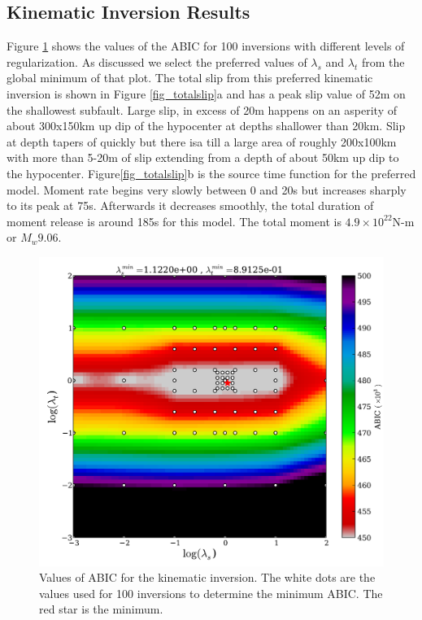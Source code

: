 \subsection{Kinematic Inversion Results}
Figure \ref{fig_ABIC} shows the values of the ABIC for 100 inversions with different levels of regularization. As discussed we select the preferred values of $\lambda_s$ and $\lambda_t$ from the global minimum of that plot. The total slip from this preferred kinematic inversion is shown in Figure \ref{fig_totalslip}a and has a peak slip value of 52m on the shallowest subfault. Large slip, in excess of 20m happens on an asperity of about 300x150km up dip of the hypocenter at depths shallower than 20km. Slip at depth tapers of quickly but there isa till a large area of roughly 200x100km with more than 5-20m of slip extending from a depth of about 50km up dip to the hypocenter. Figure\ref{fig_totalslip}b is the source time function for the preferred model. Moment rate begins very slowly between 0 and 20s but increases sharply to its peak at 75s. Afterwards it decreases smoothly, the total duration of moment release is around 185s for this model. The total moment is $4.9\times10^{22}\textrm{N-m}$ or $M_w9.06$.
\begin{figure}[!ht] 
  \centering
  \includegraphics[width=0.85\linewidth]{./figures/ch4/ABIC.pdf}
    \caption[ABIC values for kinematic inversion]{Values of ABIC for the kinematic inversion. The white dots are the values used for 100 inversions to determine the minimum ABIC. The red star is the minimum.}
  \label{fig_ABIC}
\end{figure}

